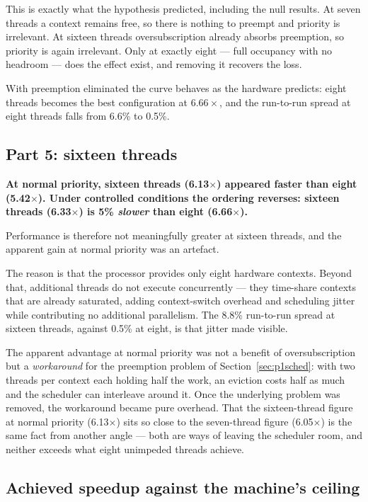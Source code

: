 \documentclass[11pt,a4paper]{article}
\begin{document}
This is exactly what the hypothesis predicted, including the null results. At
seven threads a context remains free, so there is nothing to preempt and
priority is irrelevant. At sixteen threads oversubscription already absorbs
preemption, so priority is again irrelevant. Only at exactly eight --- full
occupancy with no headroom --- does the effect exist, and removing it recovers
the loss.

With preemption eliminated the curve behaves as the hardware predicts: eight
threads becomes the best configuration at $6.66\times$, and the run-to-run
spread at eight threads falls from 6.6\% to 0.5\%.

\subsection{Part 5: sixteen threads}

\textbf{At normal priority, sixteen threads (6.13$\times$) appeared faster than
eight (5.42$\times$). Under controlled conditions the ordering reverses:
sixteen threads (6.33$\times$) is 5\% \emph{slower} than eight
(6.66$\times$).}

Performance is therefore not meaningfully greater at sixteen threads, and the
apparent gain at normal priority was an artefact.

The reason is that the processor provides only eight hardware contexts. Beyond
that, additional threads do not execute concurrently --- they time-share
contexts that are already saturated, adding context-switch overhead and
scheduling jitter while contributing no additional parallelism. The 8.8\%
run-to-run spread at sixteen threads, against 0.5\% at eight, is that jitter
made visible.

The apparent advantage at normal priority was not a benefit of
oversubscription but a \emph{workaround} for the preemption problem of
Section~\ref{sec:p1sched}: with two threads per context each holding half the
work, an eviction costs half as much and the scheduler can interleave around
it. Once the underlying problem was removed, the workaround became pure
overhead. That the sixteen-thread figure at normal priority (6.13$\times$) sits
so close to the seven-thread figure (6.05$\times$) is the same fact from
another angle --- both are ways of leaving the scheduler room, and neither
exceeds what eight unimpeded threads achieve.

\subsection{Achieved speedup against the machine's ceiling}
\label{sec:p1target}
\end{document}
